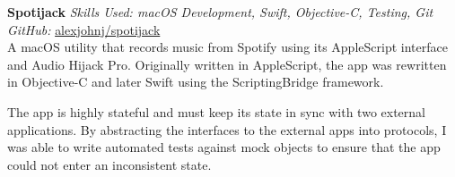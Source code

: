 \textbf{Spotijack}  \newline
\textit{Skills Used: macOS Development, Swift, Objective-C, Testing, Git}\\
\textit{GitHub:} \href{https://github.com/\myweb/spotijack}{alexjohnj/spotijack}\\
A macOS utility that records music from Spotify using its AppleScript interface
and Audio Hijack Pro. Originally written in AppleScript, the app was rewritten
in \mbox{Objective-C} and later Swift using the ScriptingBridge framework.

The app is highly stateful and must keep its state in sync with two external
applications. By abstracting the interfaces to the external apps into protocols,
I was able to write automated tests against mock objects to ensure that the app
could not enter an inconsistent state.

